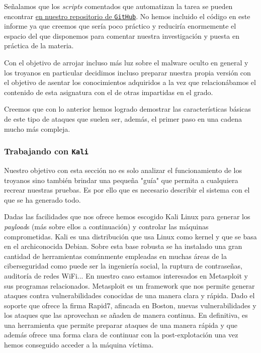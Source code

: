 \documentclass[12pt]{article}
\newcommand{\newpar} {
    \vskip 0.5cm
}
\begin{document}
            \newpar

            Señalamos que los \textit{scripts} comentados que automatizan la tarea se pueden encontrar \href{https://github.com/UAH-s-Telematics-Engineering-Tasks/info_sec_proj/scripts}{en nuestro repositorio de \texttt{GitHub}}. No hemos incluido el código en este informe ya que creemos que sería poco práctico y reduciría enormemente el espacio del que disponemos para comentar nuestra investigación y puesta en práctica de la materia.

            \newpar

            Con el objetivo de arrojar incluso más luz sobre el malware oculto en general y los troyanos en particular decidimos incluso preparar nuestra propia versión con el objetivo de asentar los conocimientos adquiridos a la vez que relacionábamos el contenido de esta asignatura con el de otras impartidas en el grado.

            \newpar

            Creemos que con lo anterior hemos logrado demostrar las características básicas de este tipo de ataques que suelen ser, además, el primer paso en una cadena mucho más compleja.

            \subsubsection{Trabajando con \texttt{Kali}}
                Nuestro objetivo con esta sección no es solo analizar el funcionamiento de los troyanos sino también brindar una pequeña "guía" que permita a cualquiera recrear nuestras pruebas. Es por ello que es necesario describir el sistema con el que se ha generado todo.

                \newpar

                Dadas las facilidades que nos ofrece hemos escogido Kali Linux para generar los \textit{payload}s (más sobre ellos a continuación) y controlar las máquinas comprometidas. Kali es una distribución que usa Linux como kernel y que se basa en el archiconocida Debian. Sobre esta base robusta se ha instalado una gran cantidad de herramientas comúnmente empleadas en muchas áreas de la ciberseguridad como puede ser la ingeniería social, la ruptura de contraseñas, auditoría de redes WiFi... En nuestro caso estamos interesados en Metasploit y sus programas relacionados. Metasploit es un framework que nos permite generar ataques contra vulnerabilidades conocidas de una manera clara y rápida. Dado el soporte que ofrece la firma Rapid7, afincada en Boston, nuevas vulnerabilidades y los ataques que las aprovechan se añaden de manera continua. En definitiva, es una herramienta que permite preparar ataques de una manera rápida y que además ofrece una forma clara de continuar con la post-explotación una vez hemos conseguido acceder a la máquina víctima.
\end{document}
